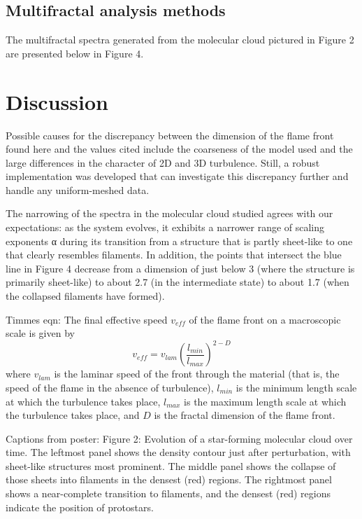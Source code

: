 \documentclass[iop]{emulateapj}
\begin{document}
\subsection{Multifractal analysis methods}\label{MultifractalResults}
The multifractal spectra generated from the molecular cloud pictured in Figure 2 are presented below in Figure 4.


\section{Discussion}\label{Discussion}
Possible causes for the discrepancy between the dimension of the flame front found here and the values cited include the coarseness of the model used and the large differences in the character of 2D and 3D turbulence. Still, a robust implementation was developed that can investigate this discrepancy further and handle any uniform-meshed data.
 
The narrowing of the spectra in the molecular cloud studied agrees with our expectations: as the system evolves, it exhibits a narrower range of scaling exponents α during its transition from a structure that is partly sheet-like to one that clearly resembles filaments. In addition, the points that intersect the blue line in Figure 4 decrease from a dimension of just below 3 (where the structure is primarily sheet-like) to about 2.7 (in the intermediate state) to about 1.7 (when the collapsed filaments have formed).


Timmes eqn:
	The final effective speed $v_{eff}$ of the flame front on a macroscopic scale is given by
	\begin{equation} 
	v_{eff} = v_{lam} \left(\frac{l_{min}}{l_{max}}\right)^{2 - D}
	\end{equation}
	where $v_{lam}$ is the laminar speed of the front through the material (that is, the speed of the flame in the absence of turbulence), $l_{min}$ is the minimum length scale at which the turbulence takes place, $l_{max}$ is the maximum length scale at which the turbulence takes place, and $ D $ is the fractal dimension of the flame front.

Captions from poster:
	Figure 2: Evolution of a star-forming molecular cloud over time. The leftmost panel shows the density contour just after perturbation, with sheet-like structures most prominent. The middle panel shows the collapse of those sheets into filaments in the densest (red) regions. The rightmost panel shows a near-complete transition to filaments, and the densest (red) regions indicate the position of protostars.
\end{document}
